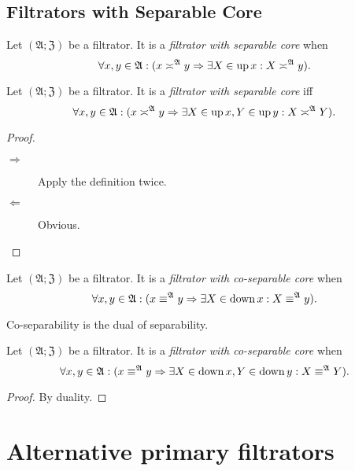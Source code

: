 \subsection{Filtrators with Separable Core}
\begin{defn}
Let $(\mathfrak{A};\mathfrak{Z})$
be a filtrator. It is a \emph{filtrator with separable core} when
\[
\forall x,y\in\mathfrak{A}:(x\asymp^{\mathfrak{A}}y\Rightarrow\exists X\in\operatorname{up} x:X\asymp^{\mathfrak{A}}y).
\]
\end{defn}
\begin{prop}
Let $(\mathfrak{A};\mathfrak{Z})$ be a filtrator. It is a \emph{filtrator
with separable core} iff
\[
\forall x,y\in\mathfrak{A}:(x\asymp^{\mathfrak{A}}y\Rightarrow\exists X\in\operatorname{up} x,Y\in\operatorname{up} y:X\asymp^{\mathfrak{A}}Y).
\]
\end{prop}
\begin{proof}
~
\begin{description}
\item [{$\Rightarrow$}] Apply the definition twice.
\item [{$\Leftarrow$}] Obvious.
\end{description}
\end{proof}
\begin{defn}
Let $(\mathfrak{A};\mathfrak{Z})$
be a filtrator. It is a \emph{filtrator with co-separable core} when
\[
\forall x,y\in\mathfrak{A}:(x\equiv^{\mathfrak{A}}y\Rightarrow\exists X\in\operatorname{down} x:X\equiv^{\mathfrak{A}}y).
\]
\end{defn}
\begin{obvious}
Co-separability is the dual of separability.\end{obvious}
\begin{defn}
Let $(\mathfrak{A};\mathfrak{Z})$
be a filtrator. It is a \emph{filtrator with co-separable core} when
\[
\forall x,y\in\mathfrak{A}:(x\equiv^{\mathfrak{A}}y\Rightarrow\exists X\in\operatorname{down} x,Y\in\operatorname{down} y:X\equiv^{\mathfrak{A}}Y).
\]
\end{defn}
\begin{proof}
By duality.
\end{proof}

\section{Alternative primary filtrators}



